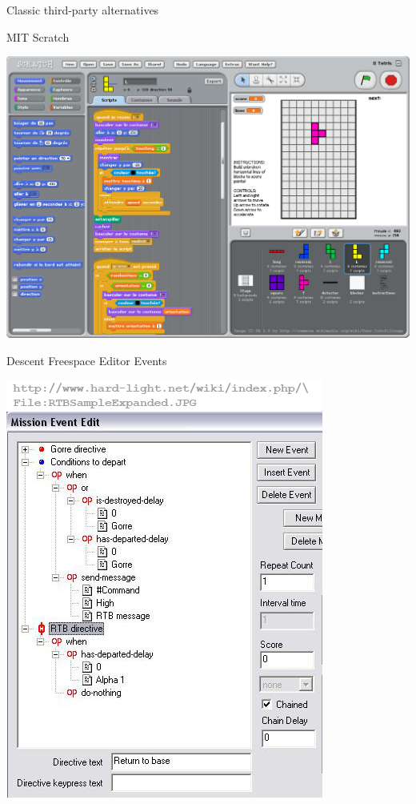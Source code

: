 \documentclass[handout]{beamer}
\begin{document}

\begin{frame}

\Huge{Classic third-party alternatives}

\end{frame}


\begin{frame}{MIT Scratch}

\includegraphics[height=.8\textheight]{scratch}

\end{frame}


\begin{frame}{Descent Freespace Editor Events}

\includegraphics[height=.8\textheight]{freespace}

\end{frame}
\end{document}
